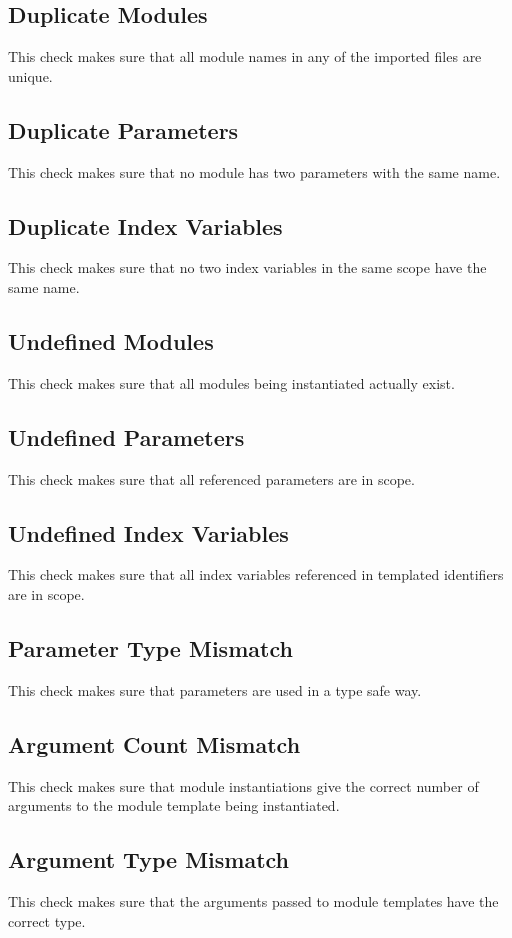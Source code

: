 \documentclass[a4paper,11pt,twoside]{report}
\begin{document}
{{{\subsection{Duplicate Modules}
This check makes sure that all module names in any of the imported files are unique.

\subsection{Duplicate Parameters}
This check makes sure that no module has two parameters with the same name.

\subsection{Duplicate Index Variables}
This check makes sure that no two index variables in the same scope have the same name.

\subsection{Undefined Modules}
This check makes sure that all modules being instantiated actually exist.

\subsection{Undefined Parameters}
This check makes sure that all referenced parameters are in scope.

\subsection{Undefined Index Variables}
This check makes sure that all index variables referenced in templated identifiers are in scope. 

\subsection{Parameter Type Mismatch}
This check makes sure that parameters are used in a type safe way.

\subsection{Argument Count Mismatch}
This check makes sure that module instantiations give the correct number of arguments to the module template being instantiated.

\subsection{Argument Type Mismatch}
This check makes sure that the arguments passed to module templates have the correct type.

}}}
\end{document}
